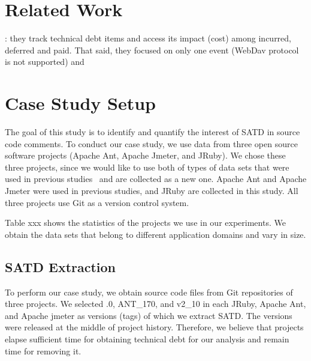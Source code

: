 \documentclass[conference]{IEEEtran}
\begin{document}
%
\section{Related Work}

\cite{Guo2011ICSM}: they track technical debt items and access its impact (cost) among incurred, deferred and paid. That said, they focused on only one event (WebDav protocol is not supported) and 


\section{Case Study Setup} \label{sec:setup}
The goal of this study is to identify and quantify the interest of SATD in source code comments.
To conduct our case study, we use data from three open source software  projects (Apache Ant, Apache Jmeter, and JRuby). We chose these three projects, since we would like to use both of types of data sets that were used in previous studies~\cite{Maldonado2015MTD,Potdar2014ICSME} and are collected as a new one. Apache Ant and Apache Jmeter were used in previous studies, and JRuby are collected in this study. All three projects use Git as a version control system. 


Table xxx shows the statistics of the projects we use in our experiments. We obtain the data sets that belong to different application domains and vary in size.



\subsection{SATD Extraction}
To perform our case study, we obtain source code files from Git repositories of three projects. We selected {.0}, {\sc ANT\_170}, and {\sc v2\_10} in each JRuby, Apache Ant, and Apache jmeter as versions (tags) of which we extract SATD. The versions were released at the middle of project history. Therefore, we believe that projects elapse sufficient time for obtaining technical debt for our analysis and remain time for removing it.
\end{document}
